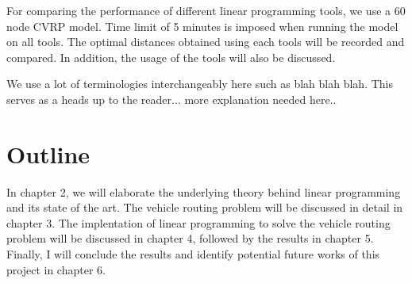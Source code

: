 For comparing the performance of different linear programming tools, we use a 60 node CVRP model. Time limit of 5 minutes is imposed
when running the model on all tools. The optimal distances obtained using each tools will be recorded and compared. In addition, the usage
of the tools will also be discussed.

We use a lot of terminologies interchangeably here such as blah blah blah. This serves as a heads up to the reader... more explanation needed here..

\section{Outline}
In chapter 2, we will elaborate the underlying theory behind linear programming and its state of the art.
The vehicle routing problem will be discussed in detail in chapter 3. The implentation of linear programming to solve the vehicle routing problem will be
discussed in chapter 4, followed by the results in chapter 5. Finally, I will conclude the results and identify potential future works
of this project in chapter 6.